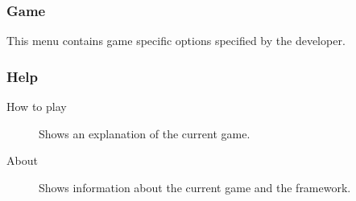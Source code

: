 \subsubsection{Game}
This menu contains game specific options specified by the developer.
\subsubsection{Help}
\begin{description}
	\item[How to play] Shows an explanation of the current game.
	\item[About] Shows information about the current game and the framework.
\end{description}




